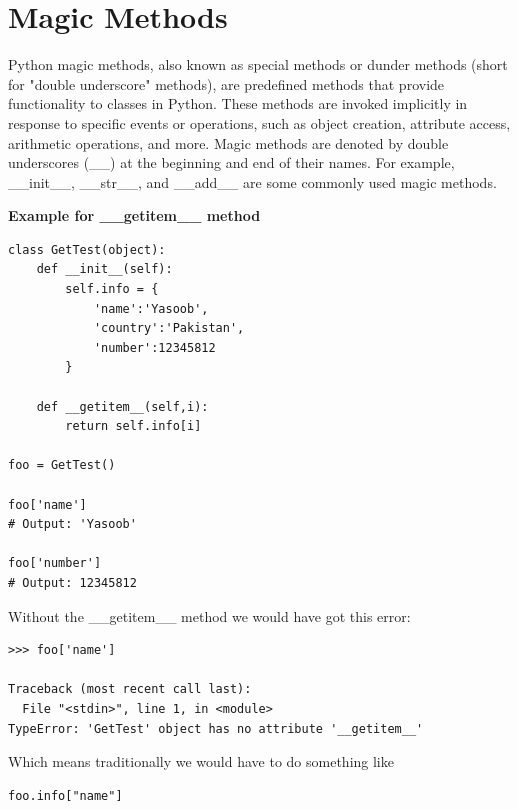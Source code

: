 \documentclass{report}
\begin{document}
    \pagebreak \bigbreak \noindent
    \section{Magic Methods}
    Python magic methods, also known as special methods or dunder methods (short for "double underscore" methods), are predefined methods that provide functionality to classes in Python. These methods are invoked implicitly in response to specific events or operations, such as object creation, attribute access, arithmetic operations, and more.
    \bigbreak \noindent 
    Magic methods are denoted by double underscores (\_\_) at the beginning and end of their names. For example, \_\_init\_\_, \_\_str\_\_, and \_\_add\_\_ are some commonly used magic methods.
    \bigbreak \noindent 
    \begin{mdframed}
        \textbf{Example for \_\_getitem\_\_ method}
        \begin{verbatim}
class GetTest(object):
    def __init__(self):
        self.info = {
            'name':'Yasoob',
            'country':'Pakistan',
            'number':12345812
        }

    def __getitem__(self,i):
        return self.info[i]

foo = GetTest()

foo['name']
# Output: 'Yasoob'

foo['number']
# Output: 12345812
        \end{verbatim}
        Without the \_\_getitem\_\_ method we would have got this error:
        \begin{verbatim}
>>> foo['name']

Traceback (most recent call last):
  File "<stdin>", line 1, in <module>
TypeError: 'GetTest' object has no attribute '__getitem__'
        \end{verbatim}
        \bigbreak \noindent 
        Which means traditionally we would have to do something like
        \begin{verbatim}
foo.info["name"]
        \end{verbatim}
    \end{mdframed}

    \pagebreak \bigbreak \noindent
\end{document}

